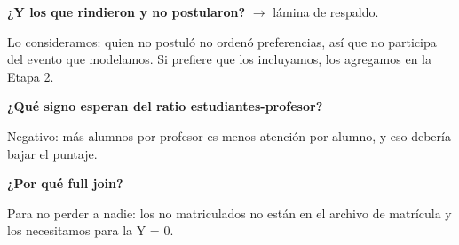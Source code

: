 \documentclass[11pt]{article}
\begin{document}
\textbf{¿Y los que rindieron y no postularon?} $\rightarrow$ lámina de respaldo.\par
\begin{guion}Lo consideramos: quien no postuló no ordenó preferencias, así que no participa del evento que modelamos. Si prefiere que los incluyamos, los agregamos en la Etapa 2.\end{guion}

\textbf{¿Qué signo esperan del ratio estudiantes-profesor?}\par
\begin{guion}Negativo: más alumnos por profesor es menos atención por alumno, y eso debería bajar el puntaje.\end{guion}

\textbf{¿Por qué full join?}\par
\begin{guion}Para no perder a nadie: los no matriculados no están en el archivo de matrícula y los necesitamos para la Y = 0.\end{guion}
\end{document}
